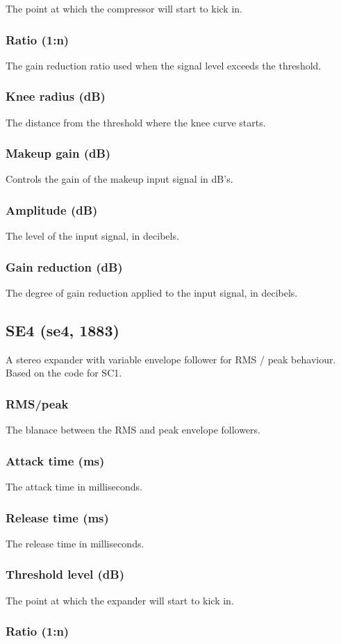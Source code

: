 \documentclass[11pt]{article}
\begin{document}
The point at which the compressor will start to kick in.\subsubsection*{Ratio (1:n)}
The gain reduction ratio used when the signal level exceeds the threshold.\subsubsection*{Knee radius (dB)}
The distance from the threshold where the knee curve starts.\subsubsection*{Makeup gain (dB)}
Controls the gain of the makeup input signal in dB's.\subsubsection*{Amplitude (dB)}
The level of the input signal, in decibels.\subsubsection*{Gain reduction (dB)}
The degree of gain reduction applied to the input signal, in decibels.\subsection{SE4 (se4, 1883)\label{se4}\label{id1883}}
A stereo expander with variable envelope follower for RMS / peak behaviour. Based on the code for SC1.\subsubsection*{RMS/peak}
The blanace between the RMS and peak envelope followers.\subsubsection*{Attack time (ms)}
The attack time in milliseconds.\subsubsection*{Release time (ms)}
The release time in milliseconds.\subsubsection*{Threshold level (dB)}
The point at which the expander will start to kick in.\subsubsection*{Ratio (1:n)}
\end{document}
